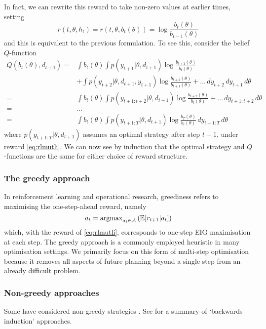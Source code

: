 In fact, we can rewrite this reward to take non-zero values at earlier times, setting
\begin{equation}
	\label{eq:rlmutli}
	r(t, \theta, h_t) = r(t, \theta, b_t(\theta)) = \log\frac{b_t(\theta)}{b_{t-1}(\theta)}
\end{equation}
and this is equivalent to the previous formulation. To see this, consider the belief $Q$-function
\begin{align}
	Q(b_t(\theta), d_{t+1}) =& \int b_t(\theta)  \int p(y_{t+1} | \theta, d_{t+1}) \log\frac{b_{t+1}(\theta)}{b_t(\theta)} \\ &+ \int p(y_{t+2} | \theta, d_{t+1}, y_{t+1}) \log \frac{b_{t+2}(\theta)}{b_{t+1}(\theta)} + \hdots \, dy_{t+2} \, dy_{t+1} \, d\theta \\
	=& \int b_t(\theta) \int p(y_{t+1:t+2}|\theta, d_{t+1}) \log \frac{b_{t+2}(\theta)}{b_t(\theta)} + \hdots \, dy_{t+1:t+2} \, d\theta \\
	=& \hdots \\
	=& \int b_t(\theta) \int p(y_{t+1:T}|\theta,d_{t+1}) \log \frac{b_T(\theta)}{b_t(\theta)} \, dy_{t+1:T} \, d\theta
\end{align}
where $p(y_{t+1:T}|\theta, d_{t+1})$ assumes an optimal strategy after step $t+1$, under reward \eqref{eq:rlmutli}. We can now see by induction that the optimal strategy and $Q$-functions are the same for either choice of reward structure.

\subsubsection{The greedy approach}
In reinforcement learning and operational research, greediness refers to maximising the one-step-ahead reward, namely
\begin{equation}
	a_t = \text{argmax}_{a_t \in \mathcal{A}} \left(\mathbb{E}[r_{t+1} | a_t] \right)
\end{equation}
which, with the reward of \eqref{eq:rlmutli}, corresponds to one-step EIG maximisation at each step. The greedy approach is a commonly employed heuristic in many optimisation settings. We primarily focus on this form of multi-step optimisation because it removes all aspects of future planning beyond a single step from an already difficult problem.

\subsubsection{Non-greedy approaches}
Some have considered non-greedy strategies \cite{gonzalez2016} \cite{pang2018}. See \cite[sec 6.1]{ryanreview} for a summary of `backwards induction' approaches.


